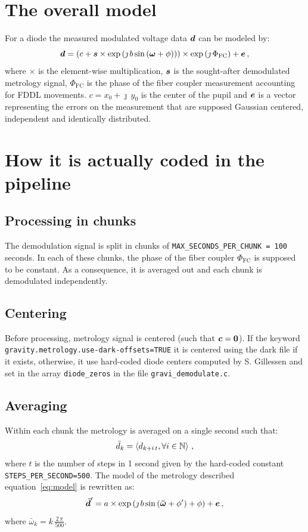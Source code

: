 \documentclass[a4paper,11pt,twoside]{scrartcl}
\begin{document}
\section{The overall model}
For a  diode the measured modulated voltage data $\boldsymbol{d}$ can be modeled by:
\begin{equation}
    \boldsymbol{d} = \left( c + \boldsymbol{s} \times  \exp\left( \jmath \, b \sin\left( \boldsymbol{\omega} + \phi\right)\right)\right)\times\exp\left(\jmath\,\Phi_\textrm{FC}\right)+  \boldsymbol{e}\,,\label{eq:model}
\end{equation}
where $\times$ is the element-wise multiplication, $\boldsymbol{s}$ is the sought-after demodulated  metrology signal, $\Phi_\textrm{FC}$ is the phase of the fiber coupler measurement accounting for FDDL movements. $c  = x_0 + \jmath\,y_0$ is the center of the pupil and $\boldsymbol{e}$ is a vector representing the errors on the measurement that are supposed Gaussian centered, independent and identically distributed.




\section{How it is actually coded in the pipeline}

\subsection{Processing in chunks}
The demodulation signal is split in chunks of  \verb+MAX_SECONDS_PER_CHUNK = 100+ seconds. In each of these chunks, the phase of the fiber coupler $\Phi_\textrm{FC}$ is supposed to be constant. As a consequence, it is averaged out and each chunk is demodulated independently. 

\subsection{Centering}
Before processing, metrology signal is centered (such that $\boldsymbol{c}=\boldsymbol{0}$). If the keyword \verb+gravity.metrology.use-dark-offsets=TRUE+  it is centered using the dark file if it exists, otherwise, it use hard-coded diode centers computed by S. Gillessen and set in the array \verb+diode_zeros+ in the file \verb|gravi_demodulate.c|. 

\subsection{Averaging}
Within each chunk the metrology is averaged on a single second such that:
\begin{equation}
    \bar{d}_k = \left\langle d_{k+i\,t}, \forall i\in \mathbb{N}\right\rangle\,,
\end{equation}
where $t$ is the number of steps in 1 second given by the hard-coded constant \verb|STEPS_PER_SECOND=500|.
The model of the metrology described equation~\ref{eq:model} is rewritten as:
\begin{equation}
    \boldsymbol{\bar{d}}' = a \times  \exp\left( \jmath \, b \sin\left( \boldsymbol{\bar{\omega}} + \phi'\right) + \phi\right)+  \boldsymbol{e}\,,\label{eq:modelpip}
\end{equation}
where $\bar{\omega}_k = k\,\frac{2\,\pi}{500}$.
\end{document}
